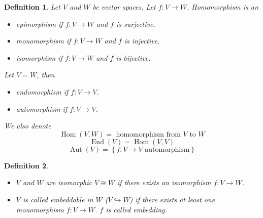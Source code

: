 \documentclass[a4paper,landscape,twocolumn]{article}
\newcommand\set[1]{\left\{#1\right\}}
\newtheorem{defi}{Definition}
\DeclareMathOperator\Hom{Hom} %
\DeclareMathOperator\End{End} %
\DeclareMathOperator\Aut{Aut} %
\begin{document}
\begin{defi}
  Let $V$ and $W$ be vector spaces.
  Let $f: V \rightarrow W$. Homomorphism is an
  \begin{itemize}
    \item \emph{epimorphism} if $f: V \rightarrow W$ and $f$ is surjective.
    \item \emph{monomorphism} if $f: V \rightarrow W$ and $f$ is injective.
    \item \emph{isomorphism} if $f: V \rightarrow W$ and $f$ is bijective.
  \end{itemize}
  Let $V = W$, then
  \begin{itemize}
    \item \emph{endomorphism} if $f: V \rightarrow V$.
    \item \emph{automorphism} if $f: V \rightarrow V$.
  \end{itemize}
  We also denote
  \[ \Hom(V, W) = \text{ homomorphism from $V$ to $W$} \]
  \[ \End(V) = \Hom(V, V) \]
  \[ \Aut(V) = \set{f: V \rightarrow V \text{ automorphism}} \]
\end{defi}

\begin{defi}
  \begin{itemize}
    \item $V$ and $W$ are \emph{isomorphic} $V \cong W$ if there exists an isomorphism $f: V \rightarrow W$.
    \item
      $V$ is called \emph{embeddable} in $W$ ($V \hookrightarrow W$) if there exists at least one monomorphism $f: V \rightarrow W$.
      $f$ is called \emph{embedding}.
  \end{itemize}
\end{defi}
\end{document}
